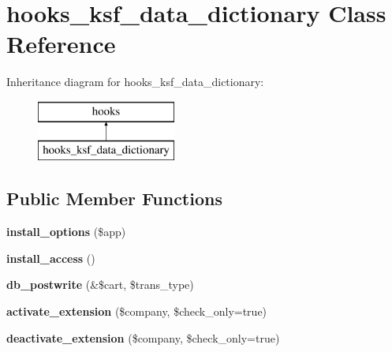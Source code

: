 \hypertarget{classhooks__ksf__data__dictionary}{}\section{hooks\+\_\+ksf\+\_\+data\+\_\+dictionary Class Reference}
\label{classhooks__ksf__data__dictionary}
Inheritance diagram for hooks\+\_\+ksf\+\_\+data\+\_\+dictionary\+:\begin{figure}[H]
\begin{center}
\leavevmode
\includegraphics[height=2.000000cm]{d6/df1/classhooks__ksf__data__dictionary}
\end{center}
\end{figure}
\subsection*{Public Member Functions}
\begin{DoxyCompactItemize}
\item 
\hypertarget{classhooks__ksf__data__dictionary_a51c2d4fb996bbf3c60f37afe16adcbdb}{}\label{classhooks__ksf__data__dictionary_a51c2d4fb996bbf3c60f37afe16adcbdb} 
{\bfseries install\+\_\+options} (\$app)
\item 
\hypertarget{classhooks__ksf__data__dictionary_ab7c5be10650a64d4b2c52de979b052ba}{}\label{classhooks__ksf__data__dictionary_ab7c5be10650a64d4b2c52de979b052ba} 
{\bfseries install\+\_\+access} ()
\item 
\hypertarget{classhooks__ksf__data__dictionary_ac2a69e2e5f533cb83d115062f212181f}{}\label{classhooks__ksf__data__dictionary_ac2a69e2e5f533cb83d115062f212181f} 
{\bfseries db\+\_\+postwrite} (\&\$cart, \$trans\+\_\+type)
\item 
\hypertarget{classhooks__ksf__data__dictionary_a19fd428e932961cf2cb8423227a57ed9}{}\label{classhooks__ksf__data__dictionary_a19fd428e932961cf2cb8423227a57ed9} 
{\bfseries activate\+\_\+extension} (\$company, \$check\+\_\+only=true)
\item 
\hypertarget{classhooks__ksf__data__dictionary_afce221968539103514cc3b5f67ccbf64}{}\label{classhooks__ksf__data__dictionary_afce221968539103514cc3b5f67ccbf64} 
{\bfseries deactivate\+\_\+extension} (\$company, \$check\+\_\+only=true)
\end{DoxyCompactItemize}
